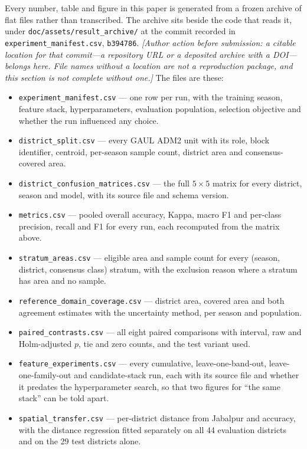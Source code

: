 \documentclass[conference]{IEEEtran}
\begin{document}
Every number, table and figure in this paper is generated from a frozen archive of flat files rather than transcribed. The archive sits beside the code that reads it, under \texttt{doc/assets/result\_archive/} at the commit recorded in \texttt{experiment\_manifest.csv}, \texttt{b394786}. \emph{[Author action before submission: a citable location for that commit---a repository URL or a deposited archive with a DOI---belongs here. File names without a location are not a reproduction package, and this section is not complete without one.]} The files are these:

\begin{itemize}
    \item \texttt{experiment\_manifest.csv} --- one row per run, with the training season, feature stack, hyperparameters, evaluation population, selection objective and whether the run influenced any choice.
    \item \texttt{district\_split.csv} --- every GAUL ADM2 unit with its role, block identifier, centroid, per-season sample count, district area and consensus-covered area.
    \item \texttt{district\_confusion\_matrices.csv} --- the full $5\times5$ matrix for every district, season and model, with its source file and schema version.
    \item \texttt{metrics.csv} --- pooled overall accuracy, Kappa, macro F1 and per-class precision, recall and F1 for every run, each recomputed from the matrix above.
    \item \texttt{stratum\_areas.csv} --- eligible area and sample count for every (season, district, consensus class) stratum, with the exclusion reason where a stratum has area and no sample.
    \item \texttt{reference\_domain\_coverage.csv} --- district area, covered area and both agreement estimates with the uncertainty method, per season and population.
    \item \texttt{paired\_contrasts.csv} --- all eight paired comparisons with interval, raw and Holm-adjusted $p$, tie and zero counts, and the test variant used.
    \item \texttt{feature\_experiments.csv} --- every cumulative, leave-one-band-out, leave-one-family-out and candidate-stack run, each with its source file and whether it predates the hyperparameter search, so that two figures for ``the same stack'' can be told apart.
    \item \texttt{spatial\_transfer.csv} --- per-district distance from Jabalpur and accuracy, with the distance regression fitted separately on all 44 evaluation districts and on the 29 test districts alone.

\end{itemize}
\end{document}
